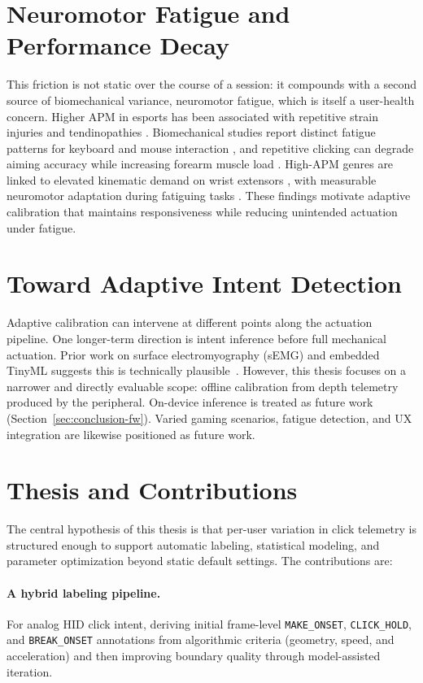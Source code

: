 \section{Neuromotor Fatigue and Performance Decay}
This friction is not static over the course of a session: it compounds with a second source of biomechanical variance, neuromotor fatigue, which is itself a user-health concern. Higher APM in esports has been associated with repetitive strain injuries and tendinopathies \cite{esports_tendinopathy, difrancisco2019managing, 1hp_esports_ergonomics}. Biomechanical studies report distinct fatigue patterns for keyboard and mouse interaction \cite{fatigue_flexor}, and repetitive clicking can degrade aiming accuracy while increasing forearm muscle load \cite{clicking_fatigue_ergonomics_2024}. High-APM genres are linked to elevated kinematic demand on wrist extensors \cite{wrist_fatigue_genre_2025}, with measurable neuromotor adaptation during fatiguing tasks \cite{heimhofer2024finger}. These findings motivate adaptive calibration that maintains responsiveness while reducing unintended actuation under fatigue.

\section{Toward Adaptive Intent Detection}
Adaptive calibration can intervene at different points along the actuation pipeline. One longer-term direction is intent inference before full mechanical actuation. Prior work on surface electromyography (sEMG) and embedded TinyML suggests this is technically plausible~\cite{reactemg, lda_emg, tinyml_mcu_inference, singh2023edge}. However, this thesis focuses on a narrower and directly evaluable scope: offline calibration from depth telemetry produced by the peripheral. On-device inference is treated as future work (Section~\ref{sec:conclusion-fw}). Varied gaming scenarios, fatigue detection, and UX integration are likewise positioned as future work.

\section{Thesis and Contributions}
The central hypothesis of this thesis is that per-user variation in click telemetry is structured enough to support automatic labeling, statistical modeling, and parameter optimization beyond static default settings. The contributions are:

\paragraph{A hybrid labeling pipeline.} For analog HID click intent, deriving
initial frame-level \texttt{MAKE\_ONSET}, \texttt{CLICK\_HOLD}, and \texttt{BREAK\_ONSET}
annotations from algorithmic criteria (geometry, speed, and acceleration)
and then improving boundary quality through model-assisted iteration.

